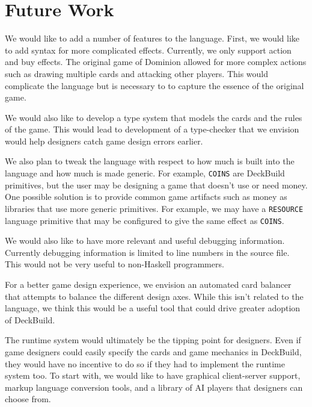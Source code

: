 
\section{Future Work}
\label{sec:future}

We would like to add a number of features to the language. First, we would like
to add syntax for more complicated effects. Currently, we only support action
and buy effects. The original game of Dominion allowed for more complex actions
such as drawing multiple cards and attacking other players. This would
complicate the language but is necessary to to capture the essence of the
original game.

We would also like to develop a type system that models the cards and the rules
of the game. This would lead to development of a type-checker that we envision
would help designers catch game design errors earlier.

We also plan to tweak the language with respect to how much is built into the
language and how much is made generic. For example, \texttt{COINS}
are DeckBuild primitives, but the user may be designing a game that doesn't use
or need money. One possible solution is to provide common game artifacts such as
money as libraries that use more generic primitives. For example, we may have a
\texttt{RESOURCE} language primitive that may be configured to give
the same effect as \texttt{COINS}.

We would also like to have more relevant and useful debugging information.
Currently debugging information is limited to line numbers in the source file.
This would not be very useful to non-Haskell programmers.

For a better game design experience, we envision an automated card balancer that
attempts to balance the different design axes. While this isn't related to the
language, we think this would be a useful tool that could drive greater adoption
of DeckBuild.

The runtime system would ultimately be the tipping point for designers. Even if
game designers could easily specify the cards and game mechanics in DeckBuild,
they would have no incentive to do so if they had to implement the runtime
system too. To start with, we would like to have graphical client-server
support, markup language conversion tools, and a library of AI players that
designers can choose from.
